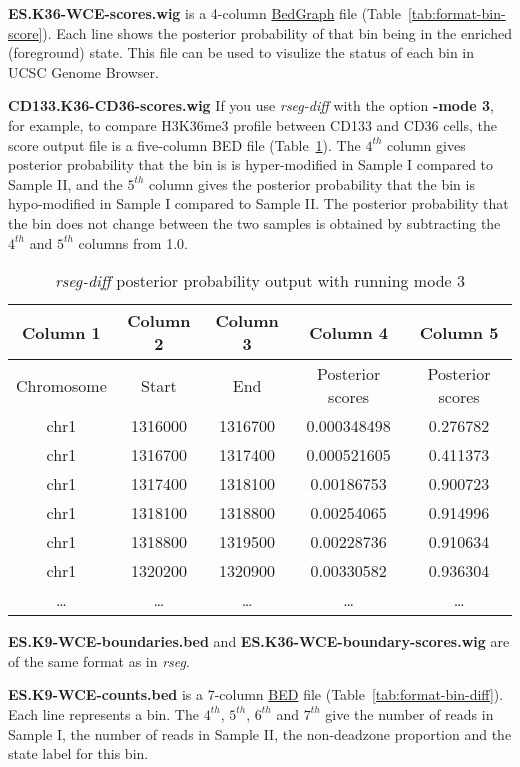 \documentclass[11pt]{report}
\begin{document}
\textbf{ES.K36-WCE-scores.wig} is a 4-column
\href{http://genome.ucsc.edu/goldenPath/help/bedgraph.html}{BedGraph}
file (Table~\ref{tab:format-bin-score}). Each line shows the posterior
probability of that bin being in the enriched (foreground) state. This
file can be used to visulize the status of each bin in UCSC Genome
Browser.

\textbf{CD133.K36-CD36-scores.wig} If you use \textit{rseg-diff} with
the option \textbf{-mode 3}, for example, to compare H3K36me3 profile
between CD133 and CD36 cells, the score output file is a five-column
BED file (Table~\ref{tab:format-score-diff}). The $4^{th}$ column
gives posterior probability that the bin is is hyper-modified in
Sample I compared to Sample II, and the $5^{th}$ column gives the
posterior probability that the bin is hypo-modified in Sample I
compared to Sample II. The posterior probability that the bin does not
change between the two samples is obtained by subtracting the $4^{th}$
and $5^{th}$ columns from 1.0.

\begin{table}[th]
  \centering
  \begin{tabular}{c c c c c }
Column 1 & Column 2 & Column 3 &  Column 4 & Column 5  \\
\hline
Chromosome  & Start & End &  Posterior scores & Posterior scores \\
\hline
chr1 &   1316000& 1316700& 0.000348498&     0.276782 \\
chr1 &   1316700& 1317400& 0.000521605&     0.411373 \\
chr1 &   1317400& 1318100& 0.00186753 &     0.900723 \\
chr1 &   1318100& 1318800& 0.00254065 &     0.914996 \\
chr1 &   1318800& 1319500& 0.00228736 &     0.910634 \\
chr1 &   1320200& 1320900& 0.00330582 &     0.936304 \\
\ldots & \ldots &\ldots &\ldots &\ldots \\ 
\hline
  \end{tabular}
  \caption{\textit{rseg-diff} posterior probability  output with running mode 3}
  \label{tab:format-score-diff}
\end{table}

\textbf{ES.K9-WCE-boundaries.bed} and
\textbf{ES.K36-WCE-boundary-scores.wig} are of the same format as
in \textit{rseg}.

\textbf{ES.K9-WCE-counts.bed} is a 7-column
\href{http://genome.ucsc.edu/FAQ/FAQformat.html#format1}{BED} file
(Table~\ref{tab:format-bin-diff}). Each line represents a bin. The $4^{th}$,
$5^{th}$, $6^{th}$ and $7^{th}$ give the number of reads in Sample I, the number
of reads in Sample II, the non-deadzone proportion and the state label for this
bin.
\end{document}
